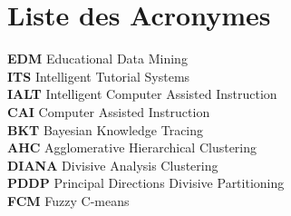 \chapter*{Liste des Acronymes }
\textbf{EDM}\hspace{0.5cm}  Educational Data Mining\\
\textbf{ITS}\hspace{0.5cm}  Intelligent Tutorial Systems\\
\textbf{IALT}\hspace{0.5cm}  Intelligent Computer Assisted Instruction\\
\textbf{CAI}\hspace{0.5cm}  Computer Assisted Instruction\\
\textbf{BKT}\hspace{0.5cm}  Bayesian Knowledge Tracing\\
\textbf{AHC}\hspace{0.5cm}  Agglomerative Hierarchical Clustering\\
\textbf{DIANA}\hspace{0.5cm}  Divisive Analysis Clustering\\
\textbf{PDDP}\hspace{0.5cm}  Principal Directions Divisive Partitioning\\
\textbf{FCM}\hspace{0.5cm}  Fuzzy C-means\\


